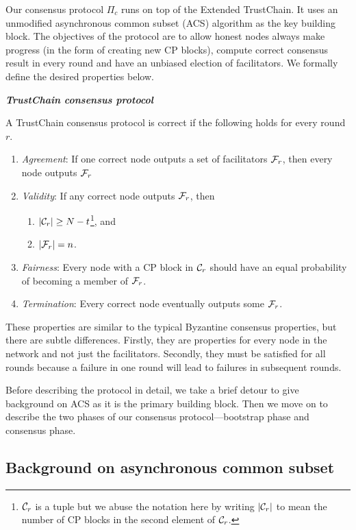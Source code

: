 Our consensus protocol $\Pi_c$ runs on top of the Extended TrustChain.
It uses an unmodified asynchronous common subset (ACS) algorithm as the key building block.
The objectives of the protocol are to
    allow honest nodes always make progress (in the form of creating new CP blocks),
    compute correct consensus result in every round
    and have an unbiased election of facilitators.
We formally define the desired properties below.
\begin{definition}
\label{def:consensus}
\textbf{\emph{TrustChain consensus protocol}}

A TrustChain consensus protocol is correct if the following holds for every round $r$.
\begin{enumerate}
    \item \emph{Agreement}:
        If one correct node outputs a set of facilitators $\mathcal{F}_r$,
        then every node outputs $\mathcal{F}_r$
    \item \emph{Validity}:
        If any correct node outputs $\mathcal{F}_r$, then 
            \begin{enumerate}
                \item $|\mathcal{C}_r| \ge N - t$\footnote{
                $\mathcal{C}_r$ is a tuple but we abuse the notation here by writing $|\mathcal{C}_r|$ to mean the number of CP blocks in the second element of $\mathcal{C}_r$.}, and
                \item $|\mathcal{F}_r| = n$.
            \end{enumerate}
    \item \emph{Fairness}:
        Every node with a CP block in $\mathcal{C}_r$ should have an equal probability of becoming a member of $\mathcal{F}_r$.
    \item \emph{Termination}:
        Every correct node eventually outputs some $\mathcal{F}_r$.
\end{enumerate}
\end{definition}
These properties are similar to the typical Byzantine consensus properties, but there are subtle differences.
Firstly, they are properties for every node in the network and not just the facilitators.
Secondly, they must be satisfied for all rounds because a failure in one round will lead to failures in subsequent rounds.

Before describing the protocol in detail,
we take a brief detour to give background on ACS as it is the primary building block.
Then we move on to describe the two phases of our consensus protocol---bootstrap phase and consensus phase.

\subsection{Background on asynchronous common subset}
\label{sec:acs-background}

